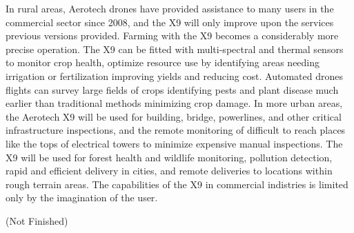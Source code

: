 In rural areas, Aerotech drones have provided assistance to many users in the commercial sector since 2008, 
and the X9 will only improve upon the services previous versions provided. Farming with the X9 becomes a 
considerably more precise operation. The X9 can be fitted with multi-spectral and thermal sensors to monitor 
crop health, optimize resource use by identifying areas needing irrigation or fertilization improving yields
 and reducing cost. Automated drones flights can survey large fields of crops identifying pests and 
 plant disease much earlier than traditional methods minimizing crop damage. 
In more urban areas, the Aerotech X9 will be used for building, bridge, powerlines, and other critical 
infrastructure inspections, and the remote monitoring of difficult to reach places like the tops of electrical 
towers to minimize expensive manual inspections. The X9 will be used for forest health and wildlife monitoring, 
pollution detection, rapid and efficient delivery in cities, and remote deliveries to locations within rough 
terrain areas. The capabilities of the X9 in commercial indistries is limited only by the imagination of the
 user. 

(Not Finished)
